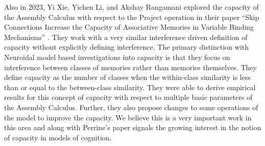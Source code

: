 Also in 2023, Yi Xie, Yichen Li, and Akshay Rangamani explored the capacity of the Assembly Calculus with respect to the Project operation in their paper ``Skip Connections Increase the Capacity of Associative Memories in Variable Binding Mechanisms'' \cite{xie2023skip}. They work with a very similar interference driven definition of capacity without explicitly defining interference. The primary distinction with Neuroidal model based investigations into capacity is that they focus on interference between classes of memories rather than memories themselves. They define capacity as the number of classes when the within-class similarity is less than or equal to the between-class similarity. They were able to derive empirical results for this concept of capacity with respect to multiple basic parameters of the Assembly Calculus. Further, they also propose changes to some operations of the model to improve the capacity. We believe this is a very important work in this area and along with Perrine's paper signals the growing interest in the notion of capacity in models of cognition.




